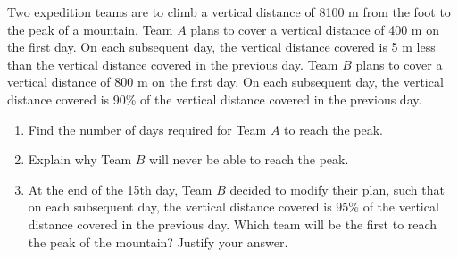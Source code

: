 \begin{problem}
    Two expedition teams are to climb a vertical distance of 8100 m from the foot to the peak of a mountain. Team $A$ plans to cover a vertical distance of 400 m on the first day. On each subsequent day, the vertical distance covered is 5 m less than the vertical distance covered in the previous day. Team $B$ plans to cover a vertical distance of 800 m on the first day. On each subsequent day, the vertical distance covered is 90\% of the vertical distance covered in the previous day.

    \begin{enumerate}
        \item Find the number of days required for Team $A$ to reach the peak.
        \item Explain why Team $B$ will never be able to reach the peak.
        \item At the end of the 15th day, Team $B$ decided to modify their plan, such that on each subsequent day, the vertical distance covered is 95\% of the vertical distance covered in the previous day. Which team will be the first to reach the peak of the mountain? Justify your answer.
    \end{enumerate}
\end{problem}
